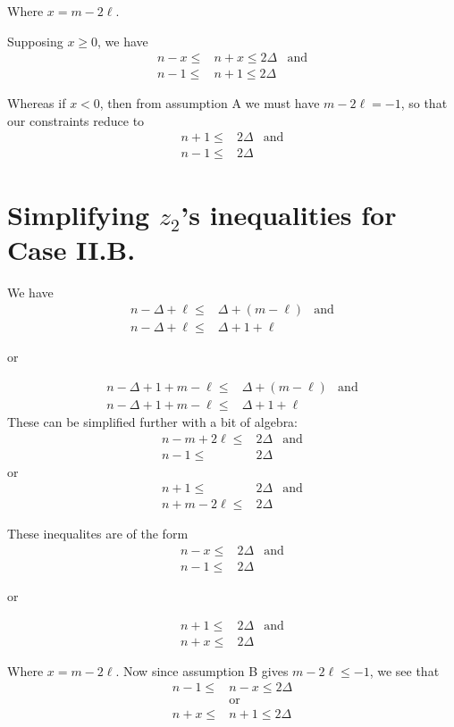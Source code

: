 \documentclass[letterpaper, 10pt]{article}
\begin{document}
Where $x = m -2\ell$.

Supposing $x\geq 0$, we have
\begin{align*}
 n-x \leq & n+x \leq 2 \Delta & \text{and} \\
 n-1 \leq & n+1 \leq 2\Delta
\end{align*}

Whereas if $x <0$, then from assumption A we must have $m-2\ell = -1$, so that
our constraints reduce to
\begin{align*}
 n+1 \leq & 2 \Delta & \text{and} \\
 n-1 \leq & 2 \Delta
\end{align*}

\newpage
\section{Simplifying $z_2$'s inequalities for Case II.B.}

We have
\begin{align*}
 n - \Delta + \ell \leq & \Delta + (m - \ell) & \text{and} \\
 n - \Delta + \ell \leq & \Delta + 1 + \ell
\end{align*}
\begin{center}or\end{center}
\begin{align*}
 n - \Delta + 1 + m - \ell \leq & \Delta + (m - \ell) & \text{and} \\
 n - \Delta + 1 + m - \ell \leq & \Delta + 1 + \ell
\end{align*}
These can be simplified further with a bit of algebra:
\begin{align*}
 n-m+2\ell \leq & 2 \Delta & \text{and} \\
 n-1 \leq       & 2\Delta
\end{align*}
or
\begin{align*}
 n+1 \leq        & 2 \Delta & \text{and} \\
 n+m-2\ell  \leq & 2 \Delta
\end{align*}

These inequalites are of the form
\begin{align*}
 n-x \leq & 2 \Delta & \text{and} \\
 n-1 \leq & 2\Delta
\end{align*}
\begin{center}or\end{center}
\begin{align*}
 n + 1 \leq & 2 \Delta & \text{and} \\
 n + x \leq & 2 \Delta
\end{align*}

Where $x = m -2\ell$. Now since assumption B gives $m - 2\ell \leq -1$, we
see that
\begin{align*}
 n-1 \leq & n-x \leq 2 \Delta \\
          & \text{or}         \\
 n+x \leq & n+1 \leq 2 \Delta
\end{align*}
\end{document}
